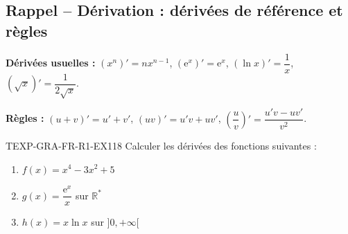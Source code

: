 

\subsection*{Rappel -- Dérivation : dérivées de référence et règles}

\textbf{Dérivées usuelles :} $(x^n)' = n x^{n-1}$, $(\mathrm{e}^x)' = \mathrm{e}^x$, $(\ln x)' = \dfrac{1}{x}$, $(\sqrt{x})' = \dfrac{1}{2\sqrt{x}}$.

\textbf{Règles :} $(u+v)' = u' + v'$, $(uv)' = u'v + uv'$, $\left(\dfrac{u}{v}\right)' = \dfrac{u'v - uv'}{v^2}$.

\begin{exercice}{TEXP-GRA-FR-R1-EX1}{1}{8}
Calculer les dérivées des fonctions suivantes :
\begin{enumerate}
  \item $f(x) = x^4 - 3x^2 + 5$
  \item $g(x) = \dfrac{\mathrm{e}^x}{x}$ sur $\mathbb{R}^*$
  \item $h(x) = x \ln x$ sur $]0, +\infty[$
\end{enumerate}
\end{exercice}

